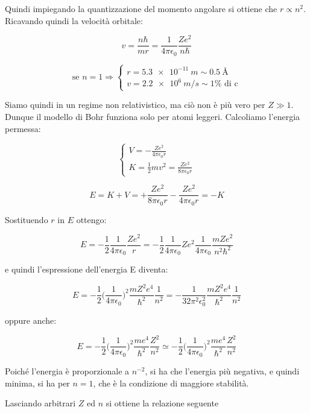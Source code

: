 Quindi impiegando la quantizzazione del momento angolare si ottiene che $r \propto n^2$.
Ricavando quindi la velocità orbitale:

$$ v = \frac{n \hbar}{m r} = \frac{1}{4\pi\epsilon_0} \frac{Z e^2}{n \hbar} $$

\begin{equation}
\mbox{se }n = 1
\Rightarrow
\begin{cases}
	r = \SI{5.3e-11}{m} \sim \SI{0.5}{\angstrom} \\
	v = \SI{2.2e6}{m/s} \sim 1\% \mbox{ di c}
\end{cases}
\end{equation}

Siamo quindi in un regime non relativistico, ma ciò non è più vero per $Z \gg 1$.
Dunque il modello di Bohr funziona solo per atomi leggeri.
Calcoliamo l'energia permessa:

\begin{equation}
\begin{cases}
	V = - \frac{Z e^2}{4 \pi \epsilon_0 r} \\
	K = \frac{1}{2} m v^2 = \frac{Z e^2}{8 \pi \epsilon_0 r} 
\end{cases}
\end{equation}

$$ E = K + V = + \frac{Z e^2}{8 \pi \epsilon_0 r} - \frac{Z e^2}{4 \pi \epsilon_0 r} = - K $$

Sostituendo $r$ in $E$ ottengo:

$$ E = - \frac{1}{2} \frac{1}{4\pi\epsilon_0} \frac{Z e^2}{r} = - \frac{1}{2} \frac{1}{4\pi\epsilon_0} Z e^2 \frac{1}{4\pi\epsilon_0} \frac{m Z e^2}{n^2 \hbar^2}$$

e quindi l'espressione dell'energia E diventa:

$$ E = - \frac{1}{2} \biggl(\frac{1}{4\pi\epsilon_0}\biggr)^2 \frac{m Z^2 e^4}{\hbar^2} \frac{1}{n^2} = - \frac{1}{32\pi^2\epsilon_0^2} \frac{m Z^2 e^4}{\hbar^2} \frac{1}{n^2} $$

oppure anche:

$$ E =   - \frac{1}{2} \biggl(\frac{1}{4\pi\epsilon_0}\biggr)^2 \frac{m e^4}{\hbar^2} \frac{Z^2}{n^2} \simeq - \frac{1}{2} \biggl(\frac{1}{4\pi\epsilon_0}\biggr)^2 \frac{m e^4}{\hbar^2} \frac{Z^2}{n^2} $$

Poiché l'energia è proporzionale a $n^{-2}$, si ha che l'energia più negativa, e quindi minima, si ha per $n = 1$, che è la condizione di maggiore stabilità.

Lasciando arbitrari $Z$ ed $n$ si ottiene la relazione seguente


